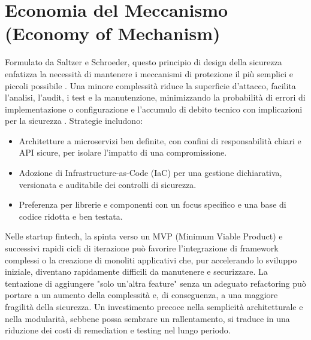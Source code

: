 \section{Economia del Meccanismo (Economy of Mechanism)}
Formulato da Saltzer e Schroeder, questo principio di design della sicurezza enfatizza la necessità di mantenere i meccanismi di protezione il più semplici e piccoli possibile \cite{Saltzer_Schroeder_1975}. Una minore complessità riduce la superficie d'attacco, facilita l'analisi, l'audit, i test e la manutenzione, minimizzando la probabilità di errori di implementazione o configurazione e l'accumulo di debito tecnico con implicazioni per la sicurezza \cite{Smith_2012_SaltzerReview}.
Strategie includono:
\begin{itemize}
\item Architetture a microservizi ben definite, con confini di responsabilità chiari e API sicure, per isolare l'impatto di una compromissione.
\item Adozione di Infrastructure-as-Code (IaC) per una gestione dichiarativa, versionata e auditabile dei controlli di sicurezza.
\item Preferenza per librerie e componenti con un focus specifico e una base di codice ridotta e ben testata.
\end{itemize}
Nelle startup fintech, la spinta verso un MVP (Minimum Viable Product) e successivi rapidi cicli di iterazione può favorire l'integrazione di framework complessi o la creazione di monoliti applicativi che, pur accelerando lo sviluppo iniziale, diventano rapidamente difficili da manutenere e securizzare. La tentazione di aggiungere "solo un'altra feature" senza un adeguato refactoring può portare a un aumento della complessità e, di conseguenza, a una maggiore fragilità della sicurezza. Un investimento precoce nella semplicità architetturale e nella modularità, sebbene possa sembrare un rallentamento, si traduce in una riduzione dei costi di remediation e testing nel lungo periodo.

